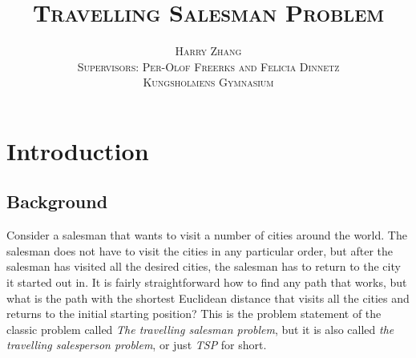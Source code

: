 \documentclass{article}
\begin{document}
\title{\huge \scshape{Travelling Salesman Problem}}
\author{
    \small \scshape{Harry Zhang} \\ 
    \small \scshape{Supervisors: Per-Olof Freerks and Felicia Dinnetz} \\
    \scriptsize \scshape{Kungsholmens Gymnasium}
}



\maketitle













\newpage

\tableofcontents

\newpage


\section{Introduction}\label{Introduction}

\subsection{Background}\label{Background}
Consider a salesman that wants to visit a number of cities around the world. The salesman does not have to visit the cities in any particular order, but after the salesman has visited all the desired cities, the salesman has to return to the city it started out in. It is fairly straightforward how to find any path that works, but what is the path with the shortest Euclidean distance that visits all the cities and returns to the initial starting position?
This is the problem statement of the classic problem called \textit{The travelling salesman problem}, but it is also called \textit{the travelling salesperson problem}, or just \textit{TSP} for short.
\newline
\end{document}

